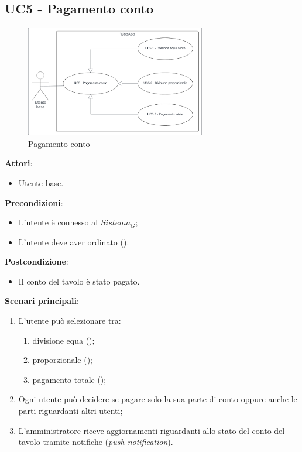 \subsection{UC5 - Pagamento conto}\label{usecase:5}
\begin{figure}[H]
    \centering
    \includegraphics[width=0.7\textwidth]{ucd/UCD5.png}
\caption{Pagamento conto}
\end{figure}
\textbf{Attori}:
\begin{itemize}
    \item Utente base.
\end{itemize}
\textbf{Precondizioni}:
\begin{itemize}
    \item L'utente è connesso al $\textit{Sistema}_G$;
    \item L'utente deve aver ordinato ().
\end{itemize}
\textbf{Postcondizione}:
\begin{itemize}
    \item Il conto del tavolo è stato pagato.
\end{itemize}
\textbf{Scenari principali}:
\begin{enumerate}
    \item L'utente può selezionare tra:
    \begin{enumerate}
        \item divisione equa ();
        \item proporzionale ();
        \item pagamento totale ();
    \end{enumerate}
    \item Ogni utente può decidere se pagare solo la sua parte di conto oppure anche le parti riguardanti altri utenti;
    \item L'amministratore riceve aggiornamenti riguardanti allo stato del conto del tavolo tramite notifiche (\emph{push-notification}).
\end{enumerate}



\newpage